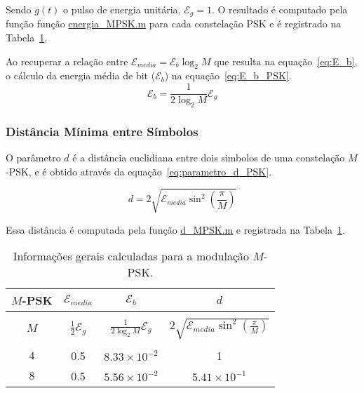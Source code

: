 Sendo $g(t)$ o pulso de energia unitária, $\mathcal{E}_g = 1$. O resultado é computado pela função função \href{https://raw.githubusercontent.com/lucasabdalah/Courses-HWs/SCD/Sistemas%20de%20Comunicacoes%20Digitais/matlab/problema4/parte1/energia_MPSK.m}{\colorbox{gray!20}{\color{red} energia\_MPSK.m}} para cada constelação PSK e é registrado na Tabela~\ref{tab:Resume_PSK}.

Ao recuperar a relação entre $\mathcal{E}_{media} = \mathcal{E}_b \log_2{M}$ que resulta na equação~\ref{eq:E_b}, o cálculo da energia média de bit ($\mathcal{E}_b$) na equação~\ref{eq:E_b_PSK}.
\begin{equation}
    \mathcal{E}_b = \frac{1}{2\log_2 M} \mathcal{E}_g
    \label{eq:E_b_PSK}
\end{equation}


\subsubsection{Distância Mínima entre Símbolos}
O parâmetro $d$ é a distância euclidiana entre dois simbolos de uma constelação $M$-PSK, e é obtido através da equação~\ref{eq:parametro_d_PSK}.

\begin{equation}
        d =2\sqrt{\mathcal{E}_{media} \sin^2\left(\frac{\pi}{M}\right)} 
    \label{eq:parametro_d_PSK}
\end{equation}

Essa distância é computada pela função \href{https://raw.githubusercontent.com/lucasabdalah/Courses-HWs/SCD/Sistemas%20de%20Comunicacoes%20Digitais/matlab/problema4/parte1/d_MPSK.m}{\colorbox{gray!20}{\color{red} d\_MPSK.m}} e registrada na Tabela~\ref{tab:Resume_PSK}.

\begin{table}[!ht]
    \centering
    \begin{tabular}{|c|c|c|c|}
    \hline
    $M$-PSK & $\mathcal{E}_{media}$ & $\mathcal{E}_{b}$ & $d$ \\ \hline
    & &  &  \\ 
    $M$ & $\frac{1}{2} \mathcal{E}_g$ & $ \frac{1}{2\log_2 M} \mathcal{E}_g$ & $2\sqrt{\mathcal{E}_{media} \sin^2\left(\frac{\pi}{M}\right) } $ \\ 
    & &  &  \\ \hline
    $4$     & 0.5 & $ 8.33\times 10^{-2}$ & 1 \\ \hline
    $8$    & 0.5 & $5.56\times 10^{-2}$ & $5.41\times 10^{-1}$ \\ \hline
    \end{tabular}
    \caption{Informações gerais calculadas para a modulação $M$-PSK.}
    \label{tab:Resume_PSK}
\end{table}
